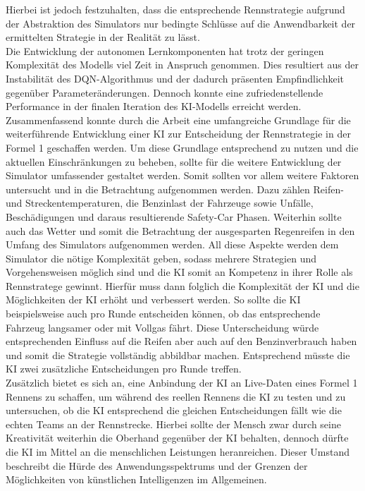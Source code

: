Hierbei ist jedoch festzuhalten, dass die entsprechende Rennstrategie aufgrund der Abstraktion des Simulators nur bedingte Schlüsse auf die Anwendbarkeit der ermittelten Strategie in der Realität zu lässt.
\\
Die Entwicklung der autonomen Lernkomponenten hat trotz der geringen Komplexität des Modells viel Zeit in Anspruch genommen. Dies resultiert aus der Instabilität des DQN-Algorithmus und der dadurch präsenten Empfindlichkeit gegenüber Parameteränderungen. Dennoch konnte eine zufriedenstellende Performance in der finalen Iteration des KI-Modells erreicht werden.
\\
Zusammenfassend konnte durch die Arbeit eine umfangreiche Grundlage für die weiterführende Entwicklung einer KI zur Entscheidung der Rennstrategie in der Formel 1 geschaffen werden. Um diese Grundlage entsprechend zu nutzen und die aktuellen Einschränkungen zu beheben, sollte für die weitere Entwicklung der Simulator umfassender gestaltet werden. Somit sollten vor allem weitere Faktoren untersucht und in die Betrachtung aufgenommen werden. Dazu zählen Reifen- und Streckentemperaturen, die Benzinlast der Fahrzeuge sowie Unfälle, Beschädigungen und daraus resultierende Safety-Car Phasen. Weiterhin sollte auch das Wetter und somit die Betrachtung der ausgesparten Regenreifen in den Umfang des Simulators aufgenommen werden. All diese Aspekte werden dem Simulator die nötige Komplexität geben, sodass mehrere Strategien und Vorgehensweisen möglich sind und die KI somit an Kompetenz in ihrer Rolle als Rennstratege gewinnt. Hierfür muss dann folglich die Komplexität der KI und die Möglichkeiten der KI erhöht und verbessert werden. So sollte die KI beispielsweise auch pro Runde entscheiden können, ob das entsprechende Fahrzeug langsamer oder mit Vollgas fährt. Diese Unterscheidung würde entsprechenden Einfluss auf die Reifen aber auch auf den Benzinverbrauch haben und somit die Strategie vollständig abbildbar machen. Entsprechend müsste die KI zwei zusätzliche Entscheidungen pro Runde treffen.\\
Zusätzlich bietet es sich an, eine Anbindung der KI an Live-Daten eines Formel 1 Rennens zu schaffen, um während des reellen Rennens die KI zu testen und zu untersuchen, ob die KI entsprechend die gleichen Entscheidungen fällt wie die echten Teams an der Rennstrecke. Hierbei sollte der Mensch zwar durch seine Kreativität weiterhin die Oberhand gegenüber der KI behalten, dennoch dürfte die KI im Mittel an die menschlichen Leistungen heranreichen. Dieser Umstand beschreibt die Hürde des Anwendungsspektrums und der Grenzen der Möglichkeiten von künstlichen Intelligenzen im Allgemeinen.
